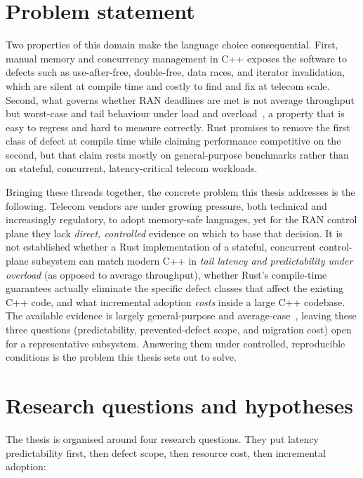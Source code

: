 \documentclass[english,oneside,a4paper,censored,csm,software-track-2020]{HYthesisML}
\begin{document}
\section{Problem statement}
Two properties of this domain make the language choice consequential. First, manual memory and
concurrency management in C++ exposes the software to defects such as use-after-free,
double-free, data races, and iterator invalidation, which are silent at compile time and costly
to find and fix at telecom scale. Second, what governs whether RAN deadlines are met is not
average throughput but worst-case and tail behaviour under load and
overload~\cite{dean2013tail}, a property that is easy to regress and hard to measure correctly.
Rust promises to remove the first class of defect at compile time while claiming performance
competitive on the second, but that claim rests mostly on general-purpose benchmarks rather
than on stateful, concurrent, latency-critical telecom workloads.

Bringing these threads together, the concrete problem this thesis addresses is the following.
Telecom vendors are under growing pressure, both technical and increasingly regulatory, to adopt
memory-safe languages, yet for the RAN control plane they lack \emph{direct, controlled}
evidence on which to base that decision. It is not established whether a Rust implementation of
a stateful, concurrent control-plane subsystem can match modern C++ in \emph{tail latency and
predictability under overload} (as opposed to average throughput), whether Rust's compile-time
guarantees actually eliminate the specific defect classes that affect the existing C++ code,
and what incremental adoption \emph{costs} inside a large C++ codebase. The available evidence
is largely general-purpose and average-case~\cite{balasubramanian2017rust,qin2020rust}, leaving
these three questions (predictability, prevented-defect scope, and migration cost) open for a
representative subsystem. Answering them under controlled, reproducible conditions is the
problem this thesis sets out to solve.

\section{Research questions and hypotheses}\label{sec:rqs}
The thesis is organised around four research questions. They put latency predictability
first, then defect scope, then resource cost, then incremental adoption:
\end{document}
